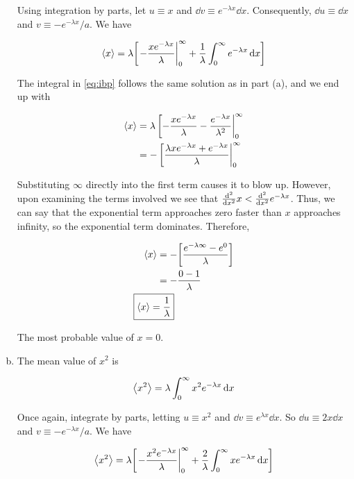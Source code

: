 \documentclass[12pt,a4paper,twocolumn]{article}
\begin{document}
\begin{enumerate}[(a)]
Using integration by parts, let $u \equiv x$ and $\dd{v} \equiv e^{-\lambda x}\dd{x}$. Consequently, $\dd{u} \equiv \dd{x}$ and $v \equiv -e^{-\lambda x}/a$. We have

\begin{equation}\label{eq:ibp}
	\ev{x} = \lambda\qty[\eval{-\frac{xe^{-\lambda x}}{\lambda}}_0^\infty + \frac{1}{\lambda}\int_0^\infty e^{-\lambda x}\dd{x}]
\end{equation}

The integral in \eqref{eq:ibp} follows the same solution as in part (a), and we end up with

\begin{align}
	\ev{x} &= \lambda \eval[-\frac{xe^{-\lambda x}}{\lambda} - \frac{e^{-\lambda x}}{\lambda^2}|_0^\infty \nonumber \\
	&= -\eval[\frac{\lambda xe^{-\lambda x} + e^{-\lambda x}}{\lambda}|_0^\infty
\end{align}

Substituting $\infty$ directly into the first term causes it to blow up. However, upon examining the terms involved we see that $\dv[2]{x}x < \dv[2]{x}e^{-\lambda x}$. Thus, we can say that the exponential term approaches zero faster than $x$ approaches infinity, so the exponential term dominates. Therefore,

\begin{align}
	\ev{x} &= -\qty[\frac{e^{-\lambda\infty} - e^0}{\lambda}] \nonumber \\
	&= -\frac{0 - 1}{\lambda} \nonumber \\
	\Aboxed{
		\ev{x} &= \frac{1}{\lambda}
	} \label{eq:answer-b}
\end{align}

The most probable value of $\boxed{x = 0}$.

\item The mean value of $x^2$ is

\begin{equation}
	\ev{x^2} = \lambda\int_0^\infty x^2 e^{-\lambda x}\dd{x}
\end{equation}

Once again, integrate by parts, letting $u \equiv x^2$ and $\dd{v} \equiv e^{\lambda x}\dd{x}$. So $\dd{u} \equiv 2x\dd{x}$ and $v \equiv -e^{-\lambda x}/a$. We have

\begin{equation}
	\ev{x^2} = \lambda\qty[\eval{-\frac{x^2 e^{-\lambda x}}{\lambda}}_0^\infty + \frac{2}{\lambda}\int_0^\infty xe^{-\lambda x}\dd{x}]
\end{equation}


\end{enumerate}
\end{document}
